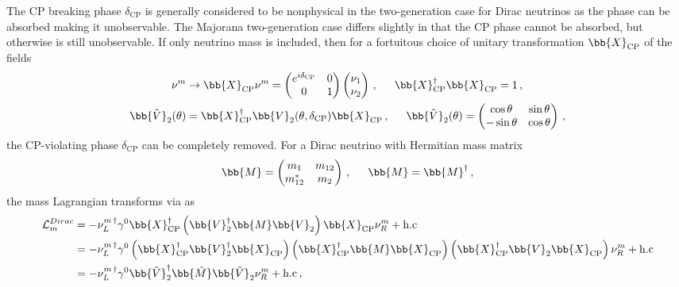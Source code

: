 The CP breaking phase $\delta_{\mathrm{CP}}$ is generally considered to be nonphysical in the two-generation case for Dirac neutrinos as the phase can be absorbed making it unobservable. The Majorana two-generation case differs slightly in that the CP phase cannot be absorbed, but otherwise is still unobservable. If only neutrino mass is included, then for a fortuitous choice of unitary transformation $\bb{X}_{\mathrm{CP}}$ of the fields
\begin{alignat}{1}
	\label{cp:eq:03a} \nu^{m}&\rightarrow\bb{X}_{\mathrm{CP}}\nu^{m}= 
	\begin{pmatrix}
		e^{i\delta_{\mathrm{CP}}}& 0 \\
		0 & 1
	\end{pmatrix}
	\begin{pmatrix}
		\nu_{1}\\
		\nu_{2}
	\end{pmatrix}\,,\indent \bb{X}_{\mathrm{CP}}^{\dagger}\bb{X}_{\mathrm{CP}}=1\,,\\
	\label{cp:eq:03b}\bb{\tilde{V}}_{2}(\theta)&=\bb{X}_{\mathrm{CP}}^{\dagger}\bb{V}_{2}(\theta,\delta_{\mathrm{CP}})\bb{X}_{\mathrm{CP}}\,,\indent \bb{\tilde{V}}_{2}(\theta)=
	\begin{pmatrix}
		\cos{\theta}&\sin{\theta}\\
		-\sin{\theta}&\cos{\theta}
	\end{pmatrix}\,,
\end{alignat}
the CP-violating phase $\delta_{\mathrm{CP}}$ can be completely removed. For a Dirac neutrino with Hermitian mass matrix
\begin{alignat}{1}
	\label{cp:eq:04} \bb{M}=
	\begin{pmatrix}
		m_{1}&m_{12}\\
		m_{12}^{*}&m_{2}
	\end{pmatrix}\,,\indent \bb{M}=\bb{M}^{\dagger}\,,
\end{alignat}
the mass Lagrangian transforms via  as
\begin{alignat}{1}
	\notag \mathcal{L}_{m}^{Dirac}&=-\nu_{L}^{m\, \dagger}\gamma^{0}\bb{X}_{\mathrm{CP}}^{\dagger}\left(\bb{V}^{\dagger}_{2}\bb{M}\bb{V}_{2}\right)\bb{X}_{\mathrm{CP}}\nu_{R}^{m}+\mathrm{h.c}\\
	\notag &=-\nu_{L}^{m\, \dagger}\gamma^{0}\left(\bb{X}_{\mathrm{CP}}^{\dagger}\bb{V}^{\dagger}_{2}\bb{X}_{\mathrm{CP}}\right)\left(\bb{X}_{\mathrm{CP}}^{\dagger}\bb{M}\bb{X}_{\mathrm{CP}}\right)\left(\bb{X}_{\mathrm{CP}}^{\dagger}\bb{V}_{2}\bb{X}_{\mathrm{CP}}\right)\nu_{R}^{m}+\mathrm{h.c}\\
	\label{cp:eq:05a} &=-\nu_{L}^{m\, \dagger}\gamma^{0}\bb{\tilde{V}}^{\dagger}_{2}\bb{\tilde{M}}\bb{\tilde{V}}_{2}\nu_{R}^{m}+\mathrm{h.c}\,,
\end{alignat}
